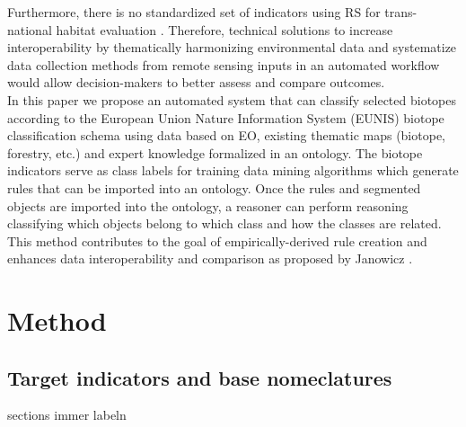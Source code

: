 \documentclass[authoryear, review,12pt,number]{elsarticle}
\begin{document}


Furthermore, there is no standardized set of indicators using RS for
trans-national habitat evaluation \citep{Lucas2015}. Therefore, technical
solutions to increase interoperability by thematically harmonizing
environmental data and systematize data collection methods from remote sensing
inputs in an automated workflow would allow decision-makers to better assess and compare outcomes. 
\\
In this paper we propose an automated system that can classify selected
biotopes according to the European Union Nature Information System (EUNIS)
biotope classification schema using data based on EO, existing thematic maps
(biotope, forestry, etc.) and expert knowledge formalized in an ontology.  The
biotope indicators serve as class labels for training data mining algorithms
which generate rules that can be imported into an ontology. Once the rules and
segmented objects are imported into the ontology, a reasoner can perform
reasoning classifying which objects belong to which class and how the classes
are related. This method contributes to the goal of empirically-derived rule
creation and enhances data interoperability and comparison as proposed by
Janowicz \citep{Janowicz2012}.  \section{Method} \subsection{Target indicators
and base nomeclatures} \label{subsec_indicators_and_nomenclatures}%
sections immer labeln
\end{document}
